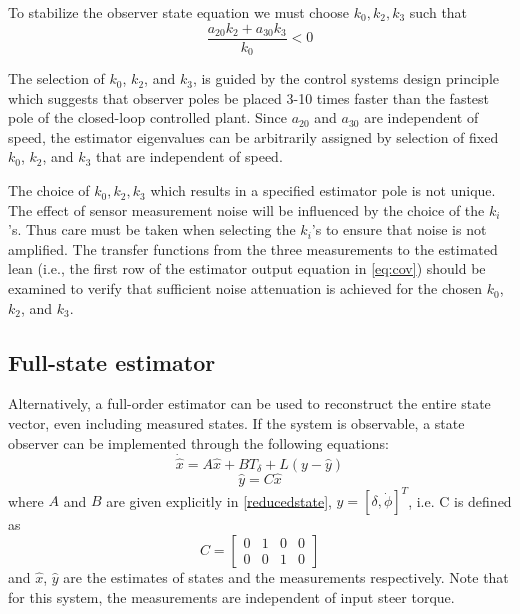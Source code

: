 \documentclass[letterpaper,11pt]{article}
\begin{document}
To stabilize the observer state equation we must choose $k_0, k_2, k_3$ such
that
\begin{equation*}
\frac{a_{20} k_{2} + a_{30} k_{3}}{k_{0}} < 0
\end{equation*}

The selection of $k_0$, $k_2$, and $k_3$, is guided by the control systems
design principle which suggests that observer poles be placed 3-10 times faster
than the fastest pole of the closed-loop controlled plant. Since $a_{20}$ and $a_{30}$ are
independent of speed, the estimator eigenvalues can be arbitrarily assigned by
selection of fixed $k_0$, $k_2$, and $k_3$ that are independent of speed.

The choice of $k_0, k_2, k_3$ which results in a specified estimator pole is
not unique. The effect of sensor measurement noise will be influenced by the
choice of the $k_i$'s. Thus care must be taken when selecting the $k_i$'s to ensure
that noise is not amplified. The transfer functions from the three measurements to
the estimated lean (i.e., the first row of the estimator output equation in
\autoref{eq:cov}) should be examined to verify that sufficient noise
attenuation is achieved for the chosen $k_0$, $k_2$, and $k_3$.

\subsection{Full-state estimator} \label{fullstate}
Alternatively, a full-order estimator can be used to reconstruct the entire
state vector, even including measured states. If the system is observable, a state
observer can be implemented through the following equations:
\begin{equation*}
\dot{\hat{x}} = A \hat{x} + B T_\delta + L \left(y - \hat{y}\right)
\end{equation*}
\begin{equation*}
\hat{y} = C \hat{x}
\end{equation*}
where $A$ and $B$ are given explicitly in \autoref{reducedstate}, $y = \left[\delta, \dot{\phi}\right]^T$, 
i.e. C is defined as
\begin{equation*}
C = \left[\begin{smallmatrix}0 & 1 & 0 & 0\\0 & 0 & 1 & 0\end{smallmatrix}\right]
\end{equation*}
and $\hat{x}$, $\hat{y}$ are the estimates of states and the measurements respectively.
Note that for this system, the measurements are independent of input steer
torque.
\end{document}
